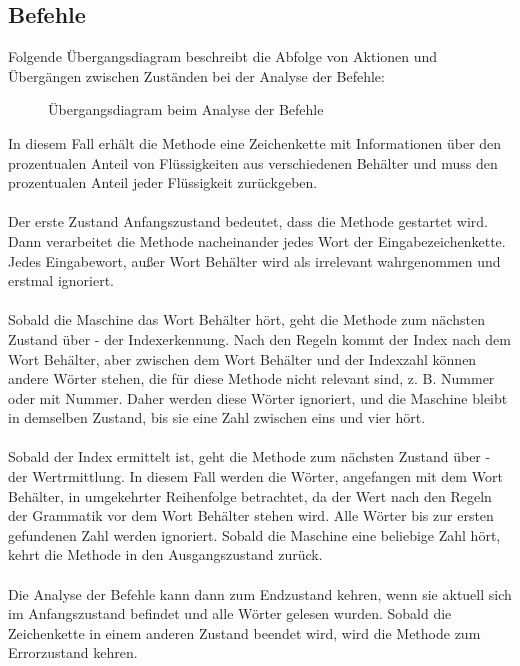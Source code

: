\subsection{Befehle}
Folgende Übergangsdiagram beschreibt die Abfolge von Aktionen und Übergängen zwischen Zuständen bei der Analyse der Befehle:
\begin{figure}[H]
    \centering
    \caption{\label{figure:Uebergangsdiagram_Befehle}Übergangsdiagram beim Analyse der Befehle}
\end{figure}
\noindent
In diesem Fall erhält die Methode eine Zeichenkette mit Informationen über den prozentualen Anteil von Flüssigkeiten aus verschiedenen Behälter und muss den prozentualen Anteil jeder Flüssigkeit zurückgeben.\\\\
Der erste Zustand \glqq{}Anfangszustand\grqq{} bedeutet, dass die Methode gestartet wird. Dann verarbeitet die Methode nacheinander jedes Wort der Eingabezeichenkette. 
Jedes Eingabewort, außer Wort \glqq{}Behälter\grqq{} wird als irrelevant wahrgenommen und erstmal ignoriert.\\\\ 
Sobald die Maschine das Wort \glqq{}Behälter\grqq{} hört, geht die Methode zum nächsten Zustand über - der Indexerkennung. 
Nach den Regeln kommt der Index nach dem Wort \glqq{}Behälter\grqq{}, aber zwischen dem Wort \glqq{}Behälter\grqq{} und der Indexzahl können andere Wörter stehen, die für diese Methode nicht relevant sind, z. B. \glqq{}Nummer\grqq{} oder \glqq{}mit Nummer\grqq{}. 
Daher werden diese Wörter ignoriert, und die Maschine bleibt in demselben Zustand, bis sie eine Zahl zwischen eins und vier hört.\\\\
Sobald der Index ermittelt ist, geht die Methode zum nächsten Zustand über - der Wertrmittlung. 
In diesem Fall werden die Wörter, angefangen mit dem Wort \glqq{}Behälter\grqq{}, in umgekehrter Reihenfolge betrachtet, da der Wert nach den Regeln der Grammatik vor dem Wort \glqq{}Behälter\grqq{} stehen wird. 
Alle Wörter bis zur ersten gefundenen Zahl werden ignoriert. 
Sobald die Maschine eine beliebige Zahl hört, kehrt die Methode in den Ausgangszustand zurück.\\\\
Die Analyse der Befehle kann dann zum Endzustand kehren, wenn sie aktuell sich im Anfangszustand befindet und alle Wörter gelesen wurden. 
Sobald die Zeichenkette in einem anderen Zustand beendet wird, wird die Methode zum Errorzustand kehren.
\endinput




